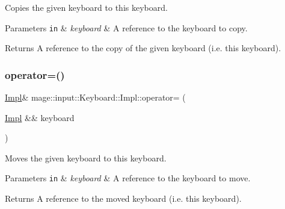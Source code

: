Copies the given keyboard to this keyboard.


\begin{DoxyParams}[1]{Parameters}
\mbox{\tt in}  & {\em keyboard} & A reference to the keyboard to copy. \\
\hline
\end{DoxyParams}
\begin{DoxyReturn}{Returns}
A reference to the copy of the given keyboard (i.\+e. this keyboard). 
\end{DoxyReturn}
\hypertarget{classmage_1_1input_1_1_keyboard_1_1_impl_adb53a165dcaf0e28ea51a64f40dcd482}{}\label{classmage_1_1input_1_1_keyboard_1_1_impl_adb53a165dcaf0e28ea51a64f40dcd482} 
\subsubsection{\texorpdfstring{operator=()}{operator=()}\hspace{0.1cm}{\footnotesize\ttfamily [2/2]}}
{\footnotesize\ttfamily \hyperlink{classmage_1_1input_1_1_keyboard_1_1_impl}{Impl}\& mage\+::input\+::\+Keyboard\+::\+Impl\+::operator= (\begin{DoxyParamCaption}\item[{\hyperlink{classmage_1_1input_1_1_keyboard_1_1_impl}{Impl} \&\&}]{keyboard }\end{DoxyParamCaption})\hspace{0.3cm}{\ttfamily [delete]}}

Moves the given keyboard to this keyboard.


\begin{DoxyParams}[1]{Parameters}
\mbox{\tt in}  & {\em keyboard} & A reference to the keyboard to move. \\
\hline
\end{DoxyParams}
\begin{DoxyReturn}{Returns}
A reference to the moved keyboard (i.\+e. this keyboard). 
\end{DoxyReturn}
\hypertarget{classmage_1_1input_1_1_keyboard_1_1_impl_a94276b53e2160e2d191c405f858a76ba}{}\label{classmage_1_1input_1_1_keyboard_1_1_impl_a94276b53e2160e2d191c405f858a76ba} 
